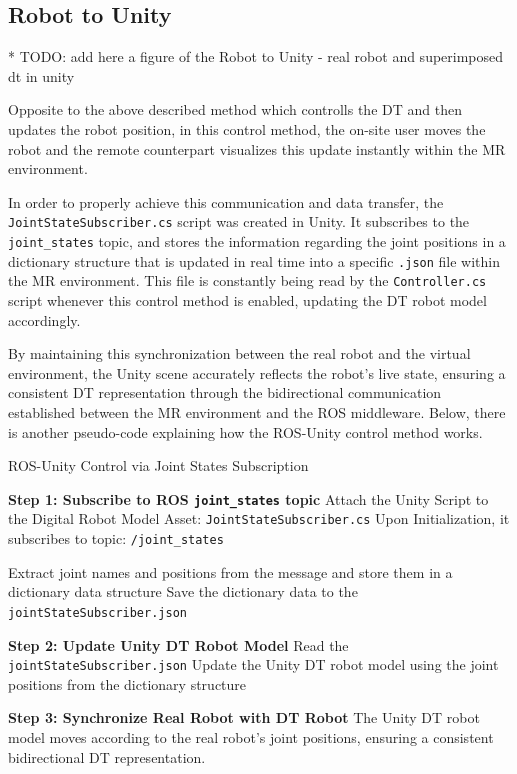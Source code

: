     
\subsection{Robot to Unity}
* TODO: add here a figure of the Robot to Unity - real robot and superimposed dt in unity

Opposite to the above described method which controlls the \ac{DT} and then updates the robot position, in this control method, the on-site user moves the robot and the remote counterpart visualizes this update instantly within the \ac{MR} environment.

In order to properly achieve this communication and data transfer, the \texttt{JointStateSubscriber.cs} script was created in Unity. It subscribes to the \texttt{joint\_states} topic, and stores the information regarding the joint positions in a dictionary structure that is updated in real time into a specific \texttt{.json} file within the \ac{MR} environment. This file is constantly being read by the \texttt{Controller.cs} script whenever this control method is enabled, updating the \ac{DT} robot model accordingly.

By maintaining this synchronization between the real robot and the virtual environment, the Unity scene accurately reflects the robot's live state, ensuring a consistent \ac{DT} representation through the bidirectional communication established between the \ac{MR} environment and the \ac{ROS} middleware. Below, there is another pseudo-code explaining how the \ac{ROS}-Unity control method works.


\begin{algorithm}
    \caption{ROS-Unity Control via Joint States Subscription}\label{alg:ros_unity_control}
    \begin{algorithmic}[1]
        \State \textbf{Step 1: Subscribe to ROS \texttt{joint\_states} topic}
        \State Attach the Unity Script to the Digital Robot Model Asset: \texttt{JointStateSubscriber.cs}
        \State Upon Initialization, it subscribes to topic: \texttt{/joint\_states}

            \State Extract joint names and positions from the message and store them in a dictionary data structure
            \State Save the dictionary data to the \texttt{jointStateSubscriber.json}
        \EndWhile

        \State \textbf{Step 2: Update Unity \ac{DT} Robot Model}
            \State Read the \texttt{jointStateSubscriber.json}
            \State Update the Unity \ac{DT} robot model using the joint positions from the dictionary structure
        \EndWhile

        \State \textbf{Step 3: Synchronize Real Robot with \ac{DT} Robot}
        \State The Unity \ac{DT} robot model moves according to the real robot’s joint positions, ensuring a consistent bidirectional \ac{DT} representation.
    \end{algorithmic}
\end{algorithm}



